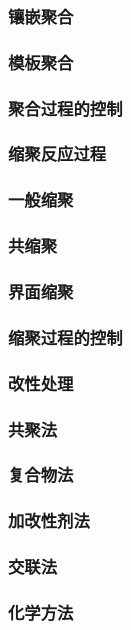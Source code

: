 \documentclass[UTF8]{../../ApplicationUniverse}
\begin{document}
            \subsubsection{镶嵌聚合}
            \subsubsection{模板聚合}
        \subsubsection{聚合过程的控制}
    \subsubsection{缩聚反应过程}
        \subsubsection{一般缩聚}
        \subsubsection{共缩聚}
        \subsubsection{界面缩聚}
        \subsubsection{缩聚过程的控制}
    \subsubsection{改性处理}
        \subsubsection{共聚法}
        \subsubsection{复合物法}
        \subsubsection{加改性剂法}
        \subsubsection{交联法}
        \subsubsection{化学方法}
\end{document}
